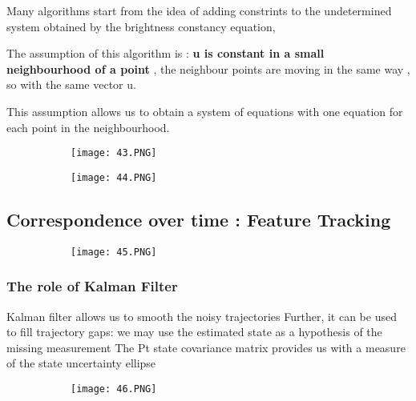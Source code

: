 \documentclass{article}
\begin{document}
Many algorithms start from the idea of adding constrints to the undetermined system obtained by the brightness constancy equation,

The assumption of this algorithm is : \textbf{u is constant in a small neighbourhood of a point} , the neighbour points are moving in the same way , so with the same vector u.

This assumption allows us to obtain a system of equations with one equation for each point in the neighbourhood.

\begin{figure}[ht!]
  \centering
  \begin{subfigure}[b]{0.7\linewidth}
    \texttt{[image: 43.PNG]}
  \end{subfigure}
\end{figure}

\begin{figure}[ht!]
  \centering
  \begin{subfigure}[b]{0.7\linewidth}
    \texttt{[image: 44.PNG]}
  \end{subfigure}
\end{figure}

\vspace{70mm}

\subsection{Correspondence over time : Feature Tracking}

\begin{figure}[ht!]
  \centering
  \begin{subfigure}[b]{0.7\linewidth}
    \texttt{[image: 45.PNG]}
  \end{subfigure}
\end{figure}


\subsubsection{The role of Kalman Filter}

Kalman filter allows us to smooth the noisy trajectories
Further, it can be used to fill trajectory gaps: we may use the estimated state as
a hypothesis of the missing measurement
The Pt state covariance matrix provides us with a measure of the state
uncertainty ellipse 

\begin{figure}[ht!]
  \centering
  \begin{subfigure}[b]{0.5\linewidth}
    \texttt{[image: 46.PNG]}
  \end{subfigure}
\end{figure}
\end{document}
